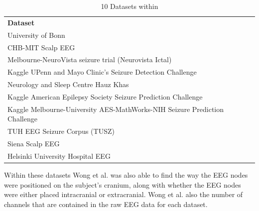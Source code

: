 \documentclass[12pt]{article}
\begin{document}
\begin{table}[H]
\centering
\begin{tabular}{l}
\textbf{Dataset}                       \\
University of Bonn                   \\
CHB-MIT Scalp EEG                    \\
Melbourne-NeuroVista seizure trial (Neurovista Ictal)                           \\
Kaggle UPenn and Mayo Clinic's Seizure Detection Challenge                     \\
Neurology and Sleep Centre Hauz Khas \\
Kaggle American Epilepsy Society Seizure Prediction Challenge                  \\
Kaggle Melbourne-University AES-MathWorks-NIH Seizure Prediction Challenge \\
TUH EEG Seizure Corpus (TUSZ)        \\
Siena Scalp EEG                      \\
Helsinki University Hospital EEG    
\end{tabular}
\caption{10 Datasets within \protect\cite{wong2023eeg}}
\end{table}

Within these datasets Wong et al. was also able to find the way the EEG nodes were positioned on the subject's cranium, along with whether the EEG nodes were either placed intracranial or extracranial. Wong et al. also the number of channels that are contained in the raw EEG data for each dataset.
\end{document}
